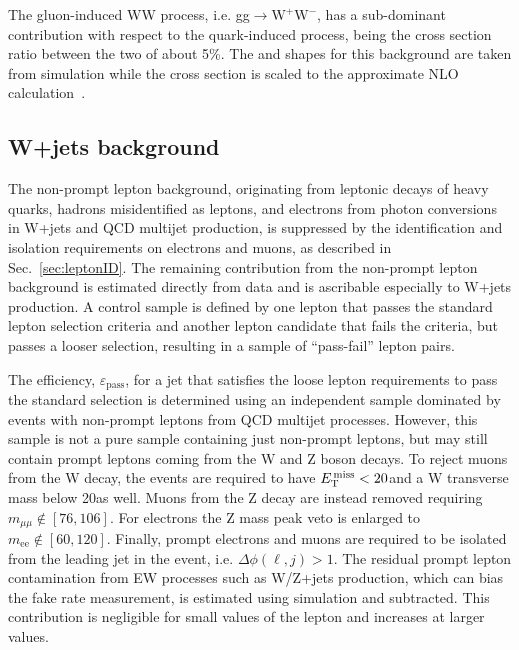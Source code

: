 The gluon-induced WW process, i.e. gg$\to \mathrm{W^{+}W^{-}}$, has a sub-dominant contribution with respect to the quark-induced process, being the cross section ratio between the two of about 5\%. The \mll and \mt shapes for this background are taken from simulation while the cross section is scaled to the approximate NLO calculation~\cite{Bonvini:2013jha,Passarino:2013bha}.






\subsection{W+jets background\label{sec:wjetsbkg}}	

The non-prompt lepton background, originating from leptonic decays of heavy quarks, hadrons
misidentified as leptons, and electrons from photon conversions in W+jets and QCD multijet production, is suppressed by the identification and isolation requirements on electrons and muons,  as described in Sec.~\ref{sec:leptonID}. The remaining contribution from the non-prompt lepton background is estimated directly from data and is ascribable especially to W+jets production. A control sample is defined by one lepton that passes the standard lepton selection criteria and another lepton candidate that fails the criteria, but passes a looser selection, resulting in a sample of ``pass-fail'' lepton pairs. 

The efficiency, $\varepsilon_\mathrm{pass}$, for a jet that satisfies the loose lepton requirements to pass the standard selection is determined using an independent sample dominated by events with non-prompt leptons from QCD multijet processes. However, this sample is not a pure sample containing just non-prompt leptons, but may still contain prompt leptons coming from the W and Z boson decays. To reject muons from the W decay, the events are required to have $E_\mathrm{T}^\mathrm{\,miss}<20$\GeV and a W transverse mass below 20\GeV as well. Muons from the Z decay are instead removed requiring $m_{\mu\mu} \notin [76,106]$\GeV. For electrons the Z mass peak veto is enlarged to $m_\mathrm{ee} \notin [60,120]$\GeV. Finally, prompt electrons and muons are required to be isolated from the leading jet in the event, i.e. $\Delta\phi(\ell,j)>1$. The residual prompt lepton contamination from EW processes such as W/Z+jets production, which can bias the fake rate measurement, is estimated using simulation and subtracted. This contribution is negligible for small values of the lepton \pt and increases at larger \pt values.

